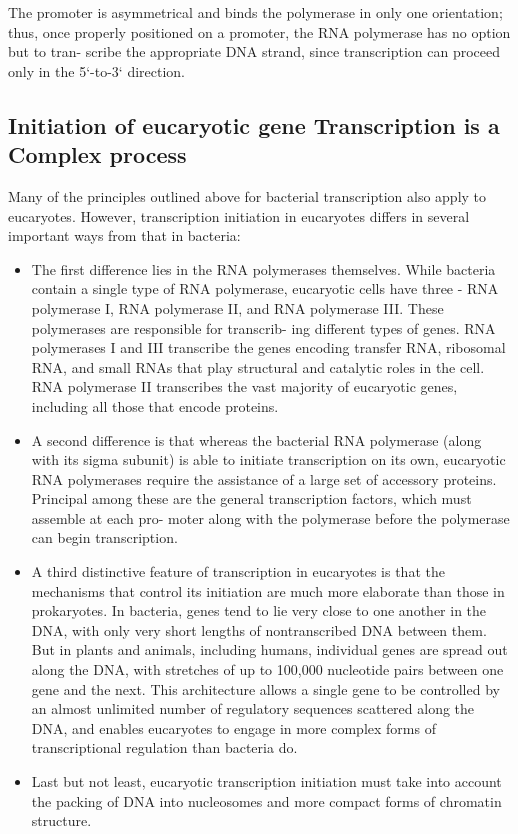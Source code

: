 The promoter is asymmetrical and binds the polymerase in only one orientation; thus, once properly
positioned on a promoter, the RNA polymerase has no option but to tran-
scribe the appropriate DNA strand, since transcription can proceed only
in the 5`-to-3` direction.

\subsection{Initiation of eucaryotic gene Transcription is a Complex process}

Many of the principles outlined above for bacterial transcription also
apply to eucaryotes. However, transcription initiation in eucaryotes differs
in several important ways from that in bacteria:

\begin{itemize}
\item The first difference lies in the RNA polymerases themselves. While
bacteria contain a single type of RNA polymerase, eucaryotic
cells have three - RNA polymerase I, RNA polymerase II, and RNA
polymerase III. These polymerases are responsible for transcrib-
ing different types of genes. RNA polymerases I and III transcribe
the genes encoding transfer RNA, ribosomal RNA, and small RNAs
that play structural and catalytic roles in the cell.
RNA polymerase II transcribes the vast majority of eucaryotic genes,
including all those that encode proteins.
\item A second difference is that whereas the bacterial RNA polymerase
(along with its sigma subunit) is able to initiate transcription
on its own, eucaryotic RNA polymerases require the assistance of
a large set of accessory proteins. Principal among these are the
general transcription factors, which must assemble at each pro-
moter along with the polymerase before the polymerase can begin
transcription.
\item A third distinctive feature of transcription in eucaryotes is that
the mechanisms that control its initiation are much more elaborate
than those in prokaryotes. In bacteria, genes tend to lie very close to one another
in the DNA, with only very short lengths of nontranscribed DNA
between them. But in plants and animals, including humans, individual
genes are spread out along the DNA, with stretches of up
to 100,000 nucleotide pairs between one gene and the next. This
architecture allows a single gene to be controlled by an almost
unlimited number of regulatory sequences scattered along the
DNA, and enables eucaryotes to engage in more complex forms of
transcriptional regulation than bacteria do.
\item Last but not least, eucaryotic transcription initiation must take into
account the packing of DNA into nucleosomes and more compact
forms of chromatin structure.
\end{itemize}

